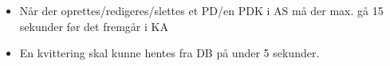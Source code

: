 
\begin{itemize}

\item Når der oprettes/redigeres/slettes et \gls{PD}/en \gls{PDK} i \gls{AS} må der max. gå 15 sekunder før det fremgår i \gls{KA}
\item En kvittering skal kunne hentes fra \gls{DB} på under 5 sekunder.

\end{itemize}